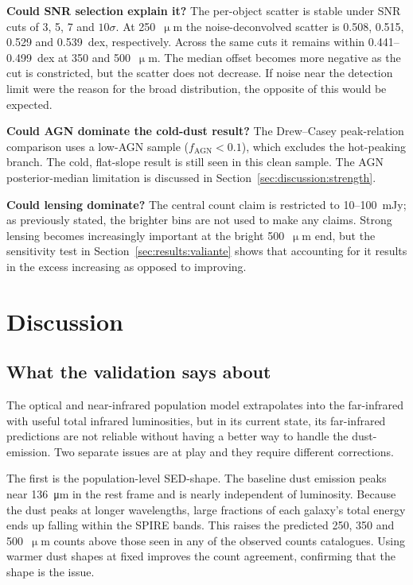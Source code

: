 \documentclass[12pt,a4paper]{article}
\begin{document}
\textbf{Could SNR selection explain it?} The per-object scatter is stable under SNR
cuts of 3, 5, 7 and $10\sigma$. At 250~$\upmu$m the noise-deconvolved scatter is
0.508, 0.515, 0.529 and \SI{0.539}{dex}, respectively. Across the same cuts it remains
within 0.441--\SI{0.499}{dex} at 350 and 500~$\upmu$m. The median offset becomes more
negative as the cut is constricted, but the scatter does not decrease. If noise near the
detection limit were the reason for the broad distribution, the opposite of this would be expected.

\textbf{Could AGN dominate the cold-dust result?} The Drew--Casey peak-relation
comparison uses a low-AGN sample ($f_\mathrm{AGN} < 0.1$), which excludes the
hot-peaking branch. The cold, flat-slope result is still seen in this clean sample. The AGN
posterior-median limitation is discussed in
Section~\ref{sec:discussion:strength}.

\textbf{Could lensing dominate?} The central count claim is restricted to
10--\SI{100}{mJy}; as previously stated, the brighter bins are not used to make any claims.
Strong lensing becomes increasingly important at the bright 500~$\upmu$m end, but the
sensitivity test in Section~\ref{sec:results:valiante} shows that accounting for it
results in the excess increasing as opposed to improving.

\section{Discussion}
\label{sec:discussion}

\subsection{What the validation says about \popcosmos{}}
\label{sec:discussion:summary}

The optical and near-infrared population model extrapolates into the far-infrared with
useful total infrared luminosities, but in its current state, its far-infrared predictions are not reliable without having a better way to handle the dust-emission. Two separate issues are at play and they require different corrections.

The first is the population-level SED-shape. The baseline dust emission peaks
near \SI{136}{\um} in the rest frame and is nearly independent of luminosity. Because the dust peaks at longer wavelengths, large fractions of each galaxy's total energy ends up falling within the SPIRE bands. This raises the predicted 250, 350
and 500~$\upmu$m counts above those seen in any of the observed counts catalogues. Using warmer
dust shapes at fixed \LIR{} improves the count agreement, confirming that the shape is the issue.
\end{document}
